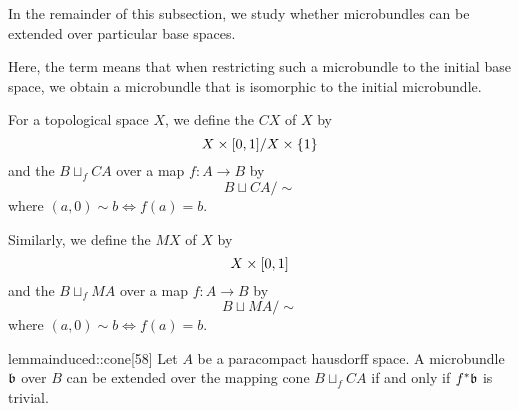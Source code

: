 \begin{myparagraph}
    In the remainder of this subsection,
    we study whether microbundles can be extended
    over particular base spaces.

    Here, the term  means that when restricting
    such a microbundle
    to the initial base space, we obtain a microbundle that
    is isomorphic to the initial microbundle.
\end{myparagraph}

\begin{myparagraph}
    For a topological space $X$, we define the  $CX$ of $X$ by
    \[ X \times{} [0, 1] / X \times \{1\} \]
    and the  $B \sqcup_f CA$ over a map $f: A \to B$ by
    \[ B \sqcup CA / \sim \]
    where $(a, 0) \sim b \iff f(a) = b$.

    Similarly, we define the  $MX$ of $X$ by
    \[ X \times{} [0, 1] \]
    and the  $B \sqcup_f MA$ over a map $f: A \to B$ by
    \[ B \sqcup MA / \sim \]
    where $(a, 0) \sim b \iff f(a) = b$.

\end{myparagraph}

\begin{mystatement}{lemma}{induced::cone}[58]
    Let $A$ be a paracompact hausdorff space.
    A microbundle $\bb$ over $B$ can be extended
    over the mapping cone $B \sqcup_f CA$ if and only if $\ind{f}\bb$ is trivial.
\end{mystatement}

